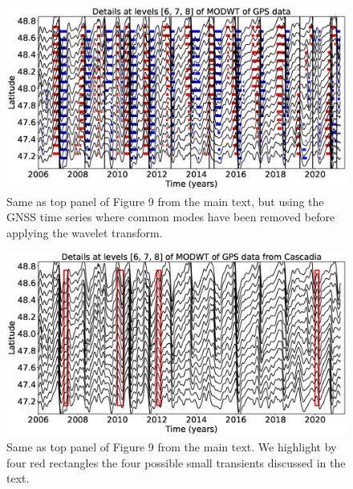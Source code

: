 \documentclass{article}
\begin{document}
\begin{figure}
\noindent\includegraphics[width=\textwidth, trim={0cm 0cm 0cm 0cm},clip]{figures/GPS_mode_details_6-7-8.eps}
\caption{Same as top panel of Figure 9 from the main text, but using the GNSS time series where common modes have been removed before applying the wavelet transform.}
\label{pngfiguresample}
\end{figure}

\begin{figure}
\noindent\includegraphics[width=\textwidth, trim={0cm 0cm 0cm 0cm},clip]{figures/GPS_longer_details_6-7-8_events.eps}
\caption{Same as top panel of Figure 9 from the main text. We highlight by four red rectangles the four possible small transients discussed in the text.}
\label{pngfiguresample}
\end{figure}
\end{document}
